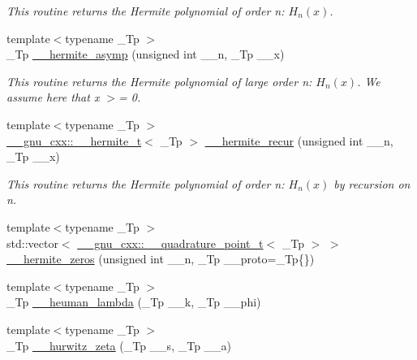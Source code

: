 \begin{DoxyCompactItemize}
\begin{DoxyCompactList}\small\item\em This routine returns the Hermite polynomial of order n\+: $ H_n(x) $. \end{DoxyCompactList}\item 
{\footnotesize template$<$typename \+\_\+\+Tp $>$ }\\\+\_\+\+Tp \hyperlink{namespacestd_1_1____detail_ae44761bc16e62979edeccf4535ec553a}{\+\_\+\+\_\+hermite\+\_\+asymp} (unsigned int \+\_\+\+\_\+n, \+\_\+\+Tp \+\_\+\+\_\+x)
\begin{DoxyCompactList}\small\item\em This routine returns the Hermite polynomial of large order n\+: $ H_n(x) $. We assume here that x $>$= 0. \end{DoxyCompactList}\item 
{\footnotesize template$<$typename \+\_\+\+Tp $>$ }\\\hyperlink{struct____gnu__cxx_1_1____hermite__t}{\+\_\+\+\_\+gnu\+\_\+cxx\+::\+\_\+\+\_\+hermite\+\_\+t}$<$ \+\_\+\+Tp $>$ \hyperlink{namespacestd_1_1____detail_addad9d3f5ca8a7ddae63c9e7c5374e70}{\+\_\+\+\_\+hermite\+\_\+recur} (unsigned int \+\_\+\+\_\+n, \+\_\+\+Tp \+\_\+\+\_\+x)
\begin{DoxyCompactList}\small\item\em This routine returns the Hermite polynomial of order n\+: $ H_n(x) $ by recursion on n. \end{DoxyCompactList}\item 
{\footnotesize template$<$typename \+\_\+\+Tp $>$ }\\std\+::vector$<$ \hyperlink{struct____gnu__cxx_1_1____quadrature__point__t}{\+\_\+\+\_\+gnu\+\_\+cxx\+::\+\_\+\+\_\+quadrature\+\_\+point\+\_\+t}$<$ \+\_\+\+Tp $>$ $>$ \hyperlink{namespacestd_1_1____detail_a34e064cf8ddf0680ce559ba3f976c6dd}{\+\_\+\+\_\+hermite\+\_\+zeros} (unsigned int \+\_\+\+\_\+n, \+\_\+\+Tp \+\_\+\+\_\+proto=\+\_\+\+Tp\{\})
\item 
{\footnotesize template$<$typename \+\_\+\+Tp $>$ }\\\+\_\+\+Tp \hyperlink{namespacestd_1_1____detail_a90938823a16cabc06031ebf209066a94}{\+\_\+\+\_\+heuman\+\_\+lambda} (\+\_\+\+Tp \+\_\+\+\_\+k, \+\_\+\+Tp \+\_\+\+\_\+phi)
\item 
{\footnotesize template$<$typename \+\_\+\+Tp $>$ }\\\+\_\+\+Tp \hyperlink{namespacestd_1_1____detail_a63aafed798ada71b2cc58e84a6652169}{\+\_\+\+\_\+hurwitz\+\_\+zeta} (\+\_\+\+Tp \+\_\+\+\_\+s, \+\_\+\+Tp \+\_\+\+\_\+a)

\end{DoxyCompactItemize}
